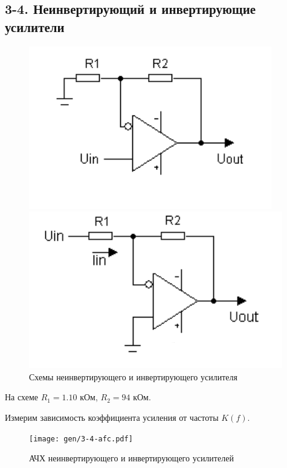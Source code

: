 \documentclass[12pt,a4paper]{article}
\begin{document}
	\subsection*{3-4. Неинвертирующий и инвертирующие усилители}
	
	\begin{figure}[H]
		\centering
		\begin{minipage}[b]{.5\textwidth}
			\includegraphics[width=0.9\linewidth]{res/3.png}
		\end{minipage}%
		\begin{minipage}[b]{.5\textwidth}
			\includegraphics[width=0.9\linewidth]{res/4.png}
		\end{minipage}
		\caption*{Схемы неинвертирующего и инвертирующего усилителя}
	\end{figure}
	

	На схеме $R_1 = 1.10$ кОм, $R_2 = 94$ кОм.

	Измерим зависимость коэффициента усиления от частоты $K(f)$.

	\begin{figure}[H]
		\centering
		\texttt{[image: gen/3-4-afc.pdf]}
		\caption{АЧХ неинвертирующего и инвертирующего усилителей}
		\label{ach34}
	\end{figure}
	
\end{document}
